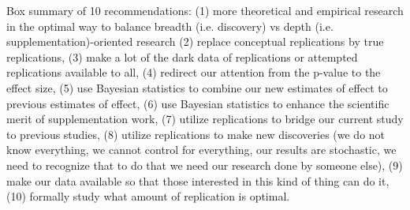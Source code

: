 \documentclass[12pt]{article}
\begin{document}
Box summary of 10 recommendations: (1) more theoretical and empirical research in the optimal way to balance breadth (i.e. discovery) vs depth (i.e. supplementation)-oriented research (2) replace conceptual replications by true replications, (3) make a lot of the dark data of replications or attempted replications available to all, (4) redirect our attention from the p-value to the effect size, (5) use Bayesian statistics to combine our new estimates of effect to previous estimates of effect, (6) use Bayesian statistics to enhance the scientific merit of supplementation work, (7) utilize replications to bridge our current study to previous studies, (8) utilize replications to make new discoveries (we do not know everything, we cannot control for everything, our results are stochastic, we need to recognize that to do that we need our research done by someone else), (9) make our data available so that those interested in this kind of thing can do it, (10) formally study what amount of replication is optimal.


 
\end{document}
